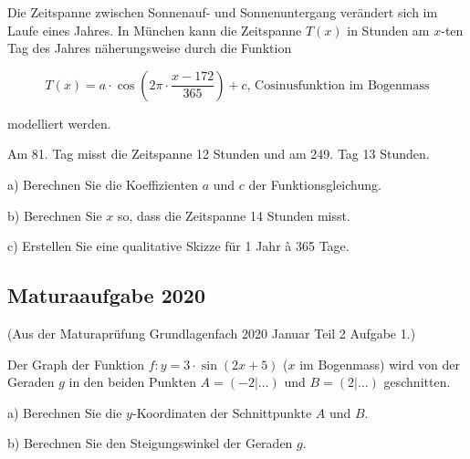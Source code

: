 Die Zeitspanne zwischen Sonnenauf- und Sonnenuntergang verändert sich im Laufe eines Jahres.
In München kann die Zeitspanne $T(x)$ in Stunden am $x$-ten Tag des Jahres näherungsweise durch die Funktion

$$T(x) = a\cdot{}\cos\left( 2\pi\cdot{}\frac{x-172}{365}\right) + c\textrm{, Cosinusfunktion im Bogenmass}$$

modelliert werden.

Am 81. Tag misst die Zeitspanne 12 Stunden und am 249. Tag 13 Stunden.

a) Berechnen Sie die Koeffizienten $a$ und $c$ der Funktionsgleichung.

b)  Berechnen Sie $x$ so, dass die Zeitspanne 14 Stunden misst.

c)  Erstellen Sie eine qualitative Skizze für 1 Jahr à 365 Tage.


\subsection{Maturaaufgabe 2020}
(Aus der Maturaprüfung Grundlagenfach 2020 Januar Teil 2 Aufgabe 1.)

Der Graph der Funktion $f: y=3\cdot{}\sin(2x+5)$ ($x$ im Bogenmass)  wird von der Geraden $g$ in den beiden Punkten $A=(-2|...)$ und $B=(2|...)$ geschnitten.

a) Berechnen Sie die $y$-Koordinaten der Schnittpunkte $A$ und $B$.

b) Berechnen Sie den Steigungswinkel der Geraden $g$.


